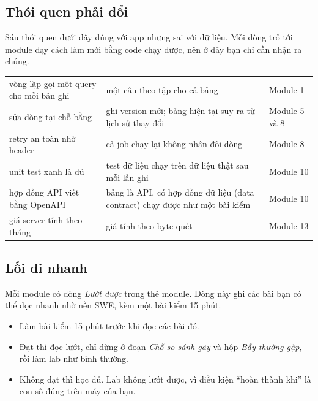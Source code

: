 \subsection{Thói quen phải đổi}

Sáu thói quen dưới đây đúng với app nhưng sai với dữ liệu. Mỗi dòng trỏ tới module dạy cách làm mới bằng code chạy được, nên ở đây bạn chỉ cần nhận ra chúng.
\begin{xltabular}{\textwidth}{@{}L L P{2.4cm}@{}}
\toprule
{} &  &  \\
\midrule
\endhead
\bottomrule
\endfoot
vòng lặp gọi một query cho mỗi bản ghi & một câu theo tập cho cả bảng & Module 1 \\
sửa dòng tại chỗ bằng  & ghi version mới; bảng hiện tại suy ra từ lịch sử thay đổi & Module 5 và 8 \\
retry an toàn nhờ header  & cả job chạy lại không nhân đôi dòng & Module 8 \\
unit test xanh là đủ & test dữ liệu chạy trên dữ liệu thật sau mỗi lần ghi & Module 10 \\
hợp đồng API viết bằng OpenAPI & bảng là API, có hợp đồng dữ liệu (data contract) chạy được như một bài kiểm & Module 10 \\
giá server tính theo tháng & giá tính theo byte quét & Module 13 \\
\end{xltabular}

\subsection{Lối đi nhanh}

Mỗi module có dòng \textit{Lướt được} trong thẻ module. Dòng này ghi các bài bạn có thể đọc nhanh nhờ nền SWE, kèm một bài kiểm 15 phút.
\begin{itemize}
  \item Làm bài kiểm 15 phút trước khi đọc các bài đó.
  \item Đạt thì đọc lướt, chỉ dừng ở đoạn \textit{Chỗ so sánh gãy} và hộp \textit{Bẫy thường gặp}, rồi làm lab như bình thường.
  \item Không đạt thì học đủ. Lab không lướt được, vì điều kiện ``hoàn thành khi'' là con số đúng trên máy của bạn.
\end{itemize}


